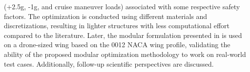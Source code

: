 (+2.5g, -1g, and cruise maneuver loads) associated with some respective safety factors. The optimization is conducted using different materials and discretizations, resulting in lighter structures with less computational effort compared to the literature. Later, the modular formulation presented in  is used on a drone-sized wing based on the 0012 NACA wing profile, validating the ability of the proposed modular optimization methodology to work on real-world test cases. Additionally, follow-up scientific perspectives are discussed.